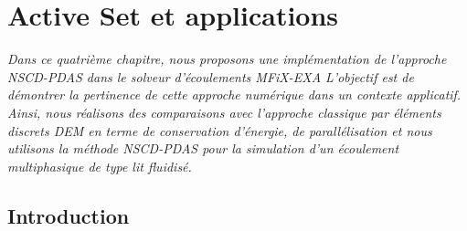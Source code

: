 \chapter{Active Set et applications}\label{chap:nscd-act-set-appli}

\newlength\longarc
\newcommand*\Arc[2][0.3pt]{%
	\settowidth\longarc{$#2$}%
	\unitlength\longarc
	\ensuremath{\stackrel{\begin{picture}(1,0.2)\linethickness{#1}\qbezier(0,0)(0.5,0.2)(1,0)\end{picture}}{#2}}%
}



\def\BBox{\hbox{\vrule height 8pt depth 0pt width 8pt}}


\def\fl{\overrightarrow}


\newenvironment{remarque}{\textbf{Remarque:}}{}

\newlength\myindent
\setlength\myindent{2em}
\newcommand\bindent{%
  \begingroup
  \setlength{\itemindent}{\myindent}
  \addtolength{\algorithmicindent}{\myindent}
}
\newcommand\eindent{\endgroup}


\vspace{1cm}


\textit{Dans ce quatrième chapitre, nous proposons une implémentation de l'approche NSCD-PDAS dans le solveur d'écoulements MFiX-EXA L'objectif est de démontrer la pertinence de cette approche numérique dans un contexte applicatif. Ainsi, nous réalisons des comparaisons avec l'approche classique par éléments discrets DEM en terme de conservation d'énergie, de parallélisation et nous utilisons la méthode NSCD-PDAS pour la simulation d'un écoulement multiphasique de type lit fluidisé.}

\vspace{1cm}

\minitoc

\newpage

\section*{Introduction}

